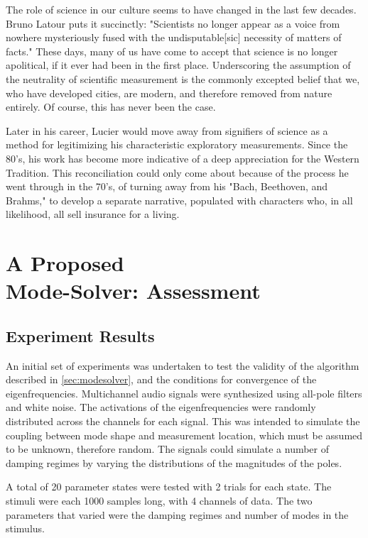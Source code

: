 \documentclass[a4paper,10pt]{report}
\numberwithin{equation}{section}
\begin{document}
The role of science in our culture seems to have changed in the last few decades. Bruno Latour puts it succinctly: "Scientists no longer appear as a voice from nowhere mysteriously fused with the undisputable[sic] necessity of matters of facts." \cite{Latour2011} These days, many of us have come to accept that science is no longer apolitical, if it ever had been in the first place. Underscoring the assumption of the neutrality of scientific measurement is the commonly excepted belief that we, who have developed cities, are modern, and therefore removed from nature entirely. Of course, this has never been the case.

Later in his career, Lucier would move away from signifiers of science as a method for legitimizing his characteristic exploratory measurements. Since the 80's, his work has become more indicative of a deep appreciation for the Western Tradition. This reconciliation could only come about because of the process he went through in the 70's, of turning away from his "Bach, Beethoven, and Brahms,"\cite[p.~1]{lucier2012} to develop a separate narrative, populated with characters who, in all likelihood, all sell insurance for a living.

\chapter{A Proposed \\Mode-Solver: Assessment}
\section{Experiment Results}\label{sec:exp_results}
An initial set of experiments was undertaken to test the validity of the algorithm described in \ref{sec:modesolver}, and the conditions for convergence of the eigenfrequencies. Multichannel audio signals were synthesized using all-pole filters and white noise. The activations of the eigenfrequencies were randomly distributed across the channels for each signal. This was intended to simulate the coupling between mode shape and measurement location, which must be assumed to be unknown, therefore random. The signals could simulate a number of damping regimes by varying the distributions of the magnitudes of the poles. 

A total of 20 parameter states were tested with 2 trials for each state. The stimuli were each 1000 samples long, with 4 channels of data. The two parameters that varied were the damping regimes and number of modes in the stimulus. 
\end{document}
